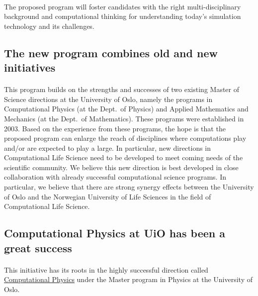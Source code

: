 \documentclass[%
oneside,                 %
final,                   %
10pt]{article}
\begin{document}
\paragraph{}
The proposed program will foster candidates with the right
multi-disciplinary background and computational thinking for
understanding today's simulation technology and its challenges.




\subsection*{The new program combines old and new initiatives}

\paragraph{}

This program builds on the strengths and successes of two existing Master of Science directions at the University of Oslo, namely the 
programs in Computational Physics (at the Dept.~of Physics) and
Applied Mathematics and Mechanics (at the Dept.~of Mathematics).
These programs were established in 2003.
Based on the experience from these programs, the hope is that the proposed program can enlarge the reach of disciplines where computations play and/or are expected to play  a large. In particular, new directions 
in Computational Life Science need to  be developed to
meet coming needs of the scientific community. We believe this new direction is
best developed in close collaboration with already successful
computational science programs.  In particular, we believe that there are strong synergy effects between the University of Oslo and the Norwegian 
University of Life Sciences in the field of Computational Life Science.




\subsection*{Computational Physics at UiO has been a great success}

\paragraph{}

This initiative has its roots in the highly successful direction called \href{{http://www.uio.no/english/studies/programmes/physics-master/programme-options/computational/index.html}}{Computational Physics}
under the Master program in Physics at the University of Oslo.
\end{document}
